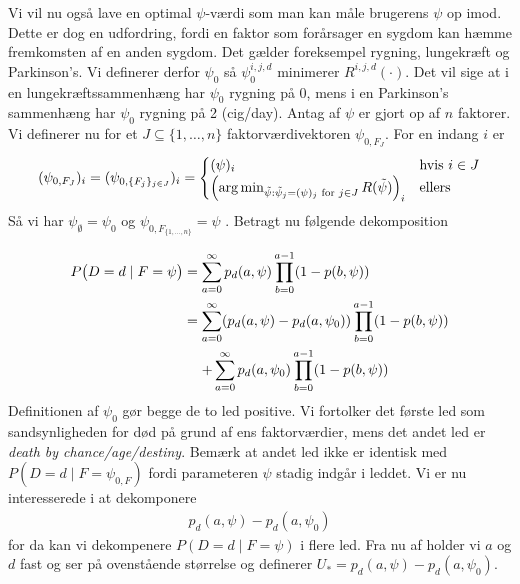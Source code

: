 \documentclass[a4paper, 12pt]{memoir}
\begin{document}
Vi vil nu også lave en optimal $\psi$-værdi som man kan måle brugerens $\psi$ op imod. Dette er dog en udfordring, fordi en faktor som forårsager en sygdom kan hæmme fremkomsten af en anden sygdom. Det gælder foreksempel rygning, lungekræft og Parkinson's. Vi definerer derfor $\psi_0$ så $\psi_0^{i,j,d}$ minimerer $R^{i,j,d}(\cdot)$. Det vil sige at i en lungekræftssammenhæng har $\psi_0$ rygning på 0, mens i en Parkinson's sammenhæng har $\psi_0$ rygning på 2 (cig/day). Antag af $\psi$ er gjort op af $n$ faktorer. Vi definerer nu for et $J\subseteq \{1,\dots, n\}$ faktorværdivektoren $\psi_{0,F_J}$. For en indang $i$ er
\begin{equation}
(\psi_{0,F_J})_i=(\psi_{0,\{F_j\}_{j\in J}})_i=\begin{cases}
(\psi)_i \qquad & \textup{hvis } i\in J\\
\Bigl(\arg\min_{\tilde \psi: \tilde \psi_j=(\psi)_j \textup{ for }j \in J} R(\tilde\psi) \Bigr)_i & \textup{ellers}
\end{cases}
\end{equation}
Så vi har $\psi_{\emptyset}=\psi_0$ og $\psi_{0,F_{\{1, \dots, n\}}}=\psi$ . Betragt nu følgende dekomposition

\begin{align*}
P\bigl(D=d \mid  F=\psi\bigr)&=\sum_{a=0}^\infty p_d(a, \psi)\prod_{b=0}^{a-1} (1-p(b,\psi)) \\
&=\begin{lgathered}[t]\sum_{a=0}^\infty (p_d(a, \psi)-p_d(a,\psi_{0}))\prod_{b=0}^{a-1} (1-p(b,\psi))\\
+\sum_{a=0}^\infty p_d(a,\psi_{0})\prod_{b=0}^{a-1} (1-p(b,\psi))\\
\end{lgathered}
\end{align*}
Definitionen af $\psi_{0}$ gør begge de to led positive. Vi fortolker det første led som sandsynligheden for død på grund af ens faktorværdier, mens det andet led er \emph{death by chance/age/destiny}. Bemærk at andet led ikke er identisk med $P(D=d\mid F=\psi_{0,F})$ fordi parameteren $\psi$ stadig indgår i leddet. Vi er nu interesserede i at dekomponere
\begin{align*}
p_d(a, \psi)-p_d(a,\psi_{0})
\end{align*}
for da kan vi dekompenere $P(D=d\mid F=\psi)$ i flere led. Fra nu af holder vi $a$ og $d$ fast og ser på ovenstående størrelse og definerer $U_*=p_d(a, \psi)-p_d(a,\psi_{0})$.
\end{document}
